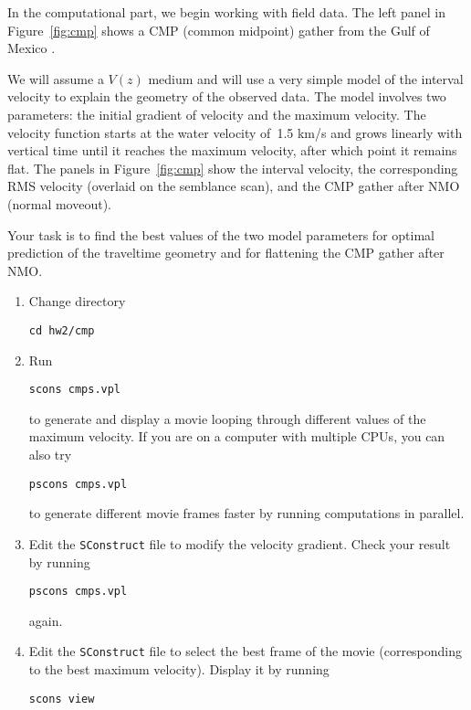 In the computational part, we begin working with field data. The left
panel in Figure~\ref{fig:cmp} shows a CMP (common midpoint) gather
from the Gulf of Mexico \cite[]{bei}.

 
We will assume a $V(z)$ medium and will use a very simple model of the
interval velocity to explain the geometry of the observed data. The
model involves two parameters: the initial gradient of velocity and
the maximum velocity. The velocity function starts at the water
velocity of~1.5 km/s and grows linearly with vertical time until it
reaches the maximum velocity, after which point it remains flat. The
panels in Figure~\ref{fig:cmp} show the interval velocity, the
corresponding RMS velocity (overlaid on the semblance scan), and the
CMP gather after NMO (normal moveout). 

Your task is to find the best values of the two model parameters for
optimal prediction of the traveltime geometry and for flattening the
CMP gather after NMO.

\begin{enumerate}
\item Change directory 
\begin{verbatim}
cd hw2/cmp
\end{verbatim}
\item Run
\begin{verbatim}
scons cmps.vpl
\end{verbatim}
to generate and display a movie looping through different values of
the maximum velocity. If you are on a computer with multiple CPUs, you
can also try
\begin{verbatim}
pscons cmps.vpl
\end{verbatim}
to generate different movie frames faster by running computations in
parallel.
\item Edit the \texttt{SConstruct} file to modify the velocity gradient. Check your result by running
\begin{verbatim}
pscons cmps.vpl
\end{verbatim}
again. 
\item Edit the \texttt{SConstruct} file to select the 
best frame of the movie (corresponding to the best maximum velocity). Display it by running
\begin{verbatim}
scons view
\end{verbatim}
\end{enumerate}

